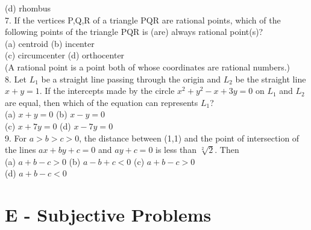 \documentclass[12pt]{article}
\begin{document}
(d) rhombus\\
7. If the vertices P,Q,R of a triangle PQR are rational points, which of the following points of the triangle PQR is (are) always rational point(s)?\\
(a) centroid \hspace{1cm}   (b)  incenter\\
(c) circumcenter \hspace{1cm} (d) orthocenter\\
(A rational point is a point both of whose coordinates are rational numbers.)\\
8. Let $L_1$ be a straight line passing through the origin and $L_2$ be the straight line $x+y=1$. If the intercepts made by the circle $x^2+y^2-x+3y=0$ on $L_1$ and $L_2$ are equal, then which of the equation can represents $L_1$?\\
(a) $x+y=0$   \hspace{1cm} (b) $x-y=0$ \\ 
(c) $x+7y=0$   \hspace{1cm} (d) $x-7y=0$\\
9. For $a>b>c>0$, the distance between (1,1) and the point of intersection of the lines $ax+by+c=0$ and $ay+c=0$ is less than $\sqrt[2]{2}$. Then\\
(a)  $a+b-c>0$ \hspace{1cm} (b)  $a-b+c<0$\hspace{1cm} (c)  $a+b-c>0$\\
\hspace{1cm}(d)  $a+b-c<0$\\

\section*{E -  Subjective Problems}
\end{document}
